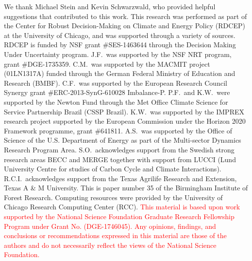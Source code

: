 \documentclass[gmd, manuscript]{copernicus} %
\begin{document}
\begin{acknowledgements}
We thank Michael Stein and Kevin Schwarzwald, who provided helpful suggestions that contributed to this work. 
This research was performed as part of the Center for Robust Decision-Making on Climate and Energy Policy (RDCEP) at the University of Chicago, and was supported through a variety of sources. 
RDCEP is funded by NSF grant \#SES-1463644 through the Decision Making Under Uncertainty program. 
J.F.\ was supported by the NSF NRT program, grant \#DGE-1735359. 
C.M.\ was supported by the MACMIT project (01LN1317A) funded through the German Federal Ministry of Education and Research (BMBF). 
C.F.\ was supported by the European Research Council Synergy grant \#ERC-2013-SynG-610028 Imbalance-P. 
P.F.\ and K.W.\ were supported  by the Newton Fund through the Met Office Climate Science for Service Partnership Brazil (CSSP Brazil). 
K.W.\ was supported by the IMPREX research project supported by the European Commission under the Horizon 2020 Framework programme, grant \#641811. 
A.S.\ was supported by the Office of Science of the U.S. Department of Energy as part of the Multi-sector Dynamics Research Program Area. 
S.O.\ acknowledges support from the Swedish strong research areas BECC and MERGE together with support from LUCCI (Lund University Centre for studies of Carbon Cycle and Climate Interactions). 
R.C.I.\ acknowledges support from the Texas Agrilife Research and Extension, Texas A \& M University. 
This is paper number 35 of the Birmingham Institute of Forest Research. 
Computing resources were provided by the University of Chicago Research Computing Center (RCC).
	\textcolor{red}{This material is based upon work supported by the National Science Foundation Graduate Research Fellowship Program under Grant No. (DGE-1746045). 
	Any opinions, findings, and conclusions or recommendations expressed in this material are those of the authors and do not necessarily reflect the views of the National Science Foundation.}
\end{acknowledgements}



\end{document}
